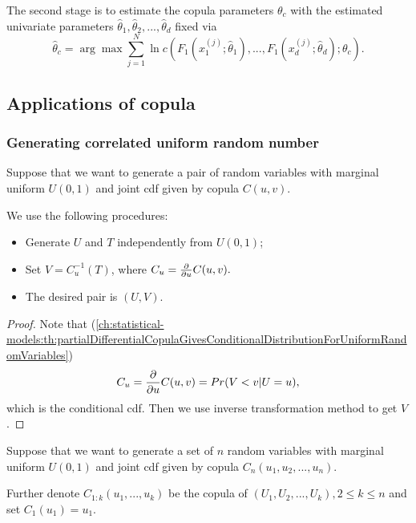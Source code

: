 \begin{refsection}
The second stage is to estimate the copula parameters $\theta_c$ with the estimated univariate parameters $\hat{\theta}_1,\hat{\theta}_2,...,\hat{\theta}_d$ fixed via
$$\hat{\theta}_c = \arg\max \sum_{j=1}^{N} \ln c(F_1(x^{(j)}_1;\hat{\theta}_1),...,F_1(x^{(j)}_d;\hat{\theta}_d);\theta_c).$$

\subsection{Applications of copula}

\subsubsection{Generating correlated uniform random number}

\begin{lemma}\cite[96]{schmitz2003copulas}
Suppose that we want to generate a pair of random variables with marginal uniform $U(0,1)$ and joint cdf given by copula $C(u,v)$. 

We use the following procedures:
\begin{itemize}
	\item Generate $U$ and $T$ independently from $U(0,1)$; 
	\item Set $V = C_u^{-1}(T)$, where
	$C_u = \frac{\partial}{\partial u}C(u,v).$
	\item The desired pair is $(U,V)$.
\end{itemize}	
\end{lemma}
\begin{proof}
Note that (\autoref{ch:statistical-models:th:partialDifferentialCopulaGivesConditionalDistributionForUniformRandomVariables})
$$C_u = \frac{\partial}{\partial u}C(u,v) = Pr(V<v|U=u),$$
which is the conditional cdf. Then we use inverse transformation method to get $V$.
\end{proof}


\begin{lemma}\cite[96]{schmitz2003copulas}
	
	Suppose that we want to generate a set of $n$ random variables with marginal uniform $U(0,1)$ and joint cdf given by copula $C_n(u_1,u_2,...,u_n)$.
	
	Further denote $C_{1:k}(u_1,...,u_k)$ be the copula of $(U_1,U_2,...,U_k), 2\leq k\leq n$ and set $C_1(u_1) = u_1$. 
	

\end{lemma}
\end{refsection}
